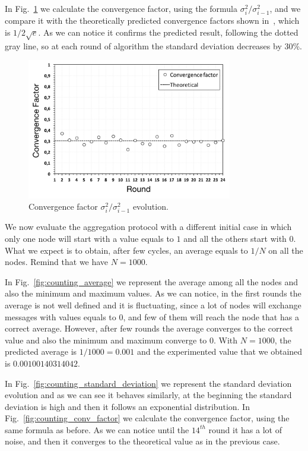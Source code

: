 In Fig.~\ref{fig:aggregation_conv_factor} we calculate the convergence factor, using the formula $\sigma_i^2 / \sigma_{i-1}^2$, and we compare it with the theoretically predicted convergence factors shown in~\cite{aggregation}, which is $1 / 2\sqrt{e}$. As we can notice it confirms the predicted result, following the dotted gray line, so at each round of algorithm the standard deviation decreases by 30\%.

\begin{figure}[ht]
  \centering
  \includegraphics[keepaspectratio=true, width=0.8\textwidth]{images/aggregation_conv_factor}\caption{Convergence factor $\sigma_i^2 / \sigma_{i-1}^2$ evolution.}
  \label{fig:aggregation_conv_factor}
\end{figure}


\newpage
We now evaluate the aggregation protocol with a different initial case in which only one node will start with a value equals to $1$ and all the others start with $0$. What we expect is to obtain, after few cycles, an average equals to $1/N$ on all the nodes. Remind that we have $N = 1000$.

In Fig.~\ref{fig:counting_average} we represent the average among all the nodes and also the minimum and maximum values. As we can notice, in the first rounds the average is not well defined and it is fluctuating, since a lot of nodes will exchange messages with values equals to 0, and few of them will reach the node that has a correct average. However, after few rounds the average converges to the correct value and also the minimum and maximum converge to $0$. With $N = 1000$, the predicted average is $1 / 1000 = 0.001$ and the experimented value that we obtained is $0.00100140314042$.

In Fig.~\ref{fig:counting_standard_deviation} we represent the standard deviation evolution and as we can see it behaves similarly, at the beginning the standard deviation is high and then it follows an exponential distribution. In Fig.~\ref{fig:counting_conv_factor} we calculate the convergence factor, using the same formula as before. As we can notice until the $14^{th}$ round it has a lot of noise, and then it converges to the theoretical value as in the previous case.

